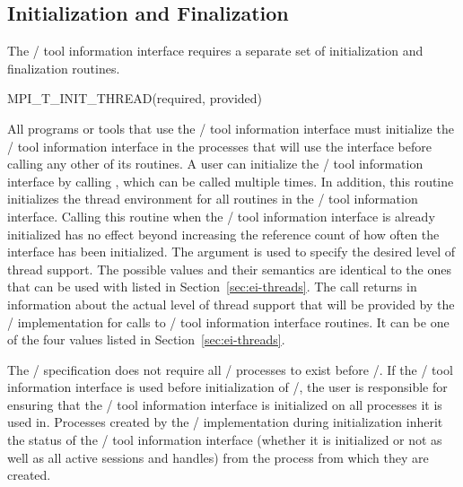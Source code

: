\subsection{Initialization and Finalization}
\label{sec:mpit:init}

The \MPI/ tool information interface requires a separate set of
initialization and finalization routines.

\begin{funcdef}{MPI\_T\_INIT\_THREAD}{(\mbox{required}, \mbox{provided})}
\end{funcdef}

All programs or tools that use the \MPI/ tool information interface must
initialize the \MPI/ tool information interface in the processes that will
use the interface before calling any other of its routines.  A user can
initialize the \MPI/ tool information interface by calling
, which can be called multiple times.  In
addition, this routine initializes the thread environment for all routines
in the \mpi/ tool information interface.  Calling this routine when the
\MPI/ tool information interface is already initialized has no effect
beyond increasing the reference count of how often the interface has been
initialized.  The argument  is used to specify the desired
level of thread support.  The possible values and their semantics are
identical to the ones that can be used with 
listed in Section~\ref{sec:ei-threads}.  The call returns in
 information about the actual level of thread support that
will be provided by the \MPI/ implementation for calls to \MPI/ tool
information interface routines.  It can be one of the four values listed in
Section~\ref{sec:ei-threads}.

The \MPI/ specification does not require all \MPI/ processes to exist
before \MPIisinitialized/.  If the \MPI/ tool information
interface is used before initialization of \MPI/, the user is
responsible for ensuring that the \MPI/ tool information interface is
initialized on all processes it is used in.  Processes created by the \MPI/
implementation during initialization inherit the status of the \MPI/
tool information interface (whether it is initialized or not as well as all
active sessions and handles) from the process from which they are created.

